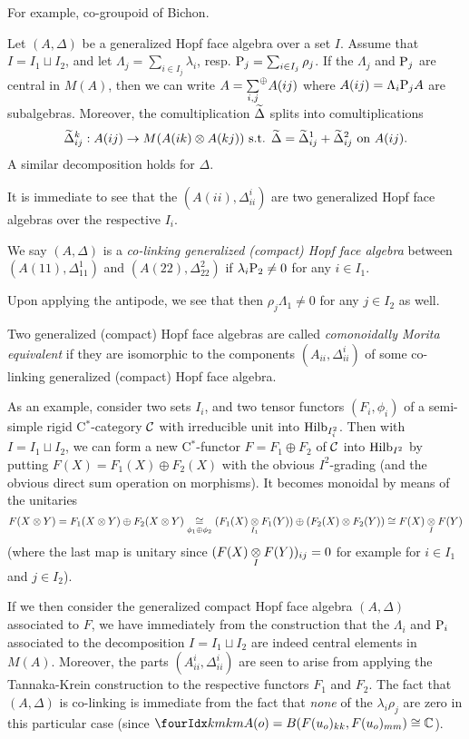 For example, co-groupoid of Bichon. 

Let $(A,\Delta)$ be a generalized Hopf face algebra over a set $I$. Assume that $I = I_1\sqcup I_2$, and let $\Lambda_j = \sum_{i\in I_j}\lambda_i$, resp. $\mathrm{P}_j = \sum_{i\in I_j} \rho_j$. If the $\Lambda_j$ and $\mathrm{P}_j$ are central in $M(A)$, then we can write $A = \underset{i,j}{\sum}^{\oplus} A(ij)$ where $A(ij) = \Lambda_i\mathrm{P}_jA$ are subalgebras. Moreover, the comultiplication $\widetilde{\Delta}$ splits into comultiplications \[\widetilde{\Delta}_{ij}^k:A(ij)\rightarrow M(A(ik)\otimes A(kj))\textrm{ s.t. } \widetilde{\Delta} = \widetilde{\Delta}_{ij}^1 +\widetilde{\Delta}_{ij}^2 \textrm{ on }A(ij).\] A similar decomposition holds for $\Delta$.

It is immediate to see that the $(A(ii),\Delta_{ii}^i)$ are two generalized Hopf face algebras over the respective $I_i$.

\begin{Def} We say $(A,\Delta)$ is a \emph{co-linking generalized (compact) Hopf face algebra} between $(A(11),\Delta_{11}^1)$ and $(A(22),\Delta_{22}^2)$ if $\lambda_i\mathrm{P}_2\neq 0$ for any $i\in I_1$.
\end{Def}

Upon applying the antipode, we see that then $\rho_j\Lambda_1\neq 0$ for any $j\in I_2$ as well.

\begin{Def} Two generalized (compact) Hopf face algebras are called \emph{comonoidally Morita equivalent} if they are isomorphic to the components $(A_{ii},\Delta_{ii}^i)$ of some co-linking generalized (compact) Hopf face algebra.\end{Def}

As an example, consider two sets $I_i$, and two tensor functors $(F_i,\phi_i)$ of a semi-simple rigid C$^*$-category $\mathcal{C}$ with irreducible unit into $\mathrm{Hilb}_{I_i^2}$. Then with $I= I_1\sqcup I_2$, we can form a new C$^*$-functor $F=F_1\oplus F_2$ of $\mathcal{C}$ into $\mathrm{Hilb}_{I^2}$ by putting $F(X) = F_1(X)\oplus F_2(X)$ with the obvious $I^2$-grading (and the obvious direct sum operation on morphisms). It becomes monoidal by means of the unitaries \[F(X\otimes Y) = F_1(X\otimes Y)\oplus F_2(X\otimes Y) \underset{\phi_1\oplus \phi_2}{\cong} (F_1(X)\underset{I_1}{\otimes} F_1(Y)) \oplus (F_2(X)\otimes F_2(Y)) \cong F(X)\underset{I}{\otimes} F(Y)\] (where the last map is unitary since $(F(X)\underset{I}{\otimes} F(Y))_{ij}=0$ for example for $i\in I_1$ and $j\in I_2$).

If we then consider the generalized compact Hopf face algebra $(A,\Delta)$ associated to $F$, we have immediately from the construction that the $\Lambda_i$ and $\mathrm{P}_i$ associated to the decomposition $I = I_1\sqcup I_2$ are indeed central elements in $M(A)$. Moreover, the parts $(A_{ii}^i,\Delta_{ii}^i)$ are seen to arise from applying the Tannaka-Krein construction to the respective functors $F_1$ and $F_2$. The fact that $(A,\Delta)$ is co-linking is immediate from the fact that \emph{none} of the $\lambda_i\rho_j$ are zero in this particular case (since $\Gr{A}{k}{k}{m}{m}(o) = B(F(u_o)_{kk},F(u_o)_{mm}) \cong \C$).

